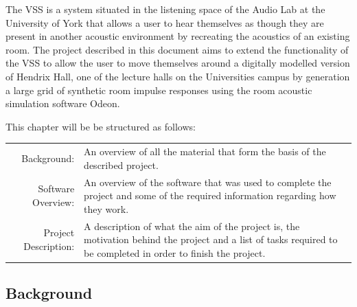 \documentclass[../../main.tex]{subfiles}
\begin{document}
	The \ac{VSS} is a system situated in the listening space of the Audio Lab at the University of York that allows a user to hear themselves as though they are present in another acoustic environment by recreating the acoustics of an existing room. The project described in this document aims to extend the functionality of the \ac{VSS} to allow the user to move themselves around a digitally modelled version of Hendrix Hall, one of the lecture halls on the Universities campus by generation a large grid of synthetic room impulse responses using the room acoustic simulation software Odeon.



	This chapter will be be structured as follows:

	\begin{tabular}{r p{}}
	Background: & An overview of all the material that form the basis of the described project. \\
	Software Overview: & An overview of the software that was used to complete the project and some of the required information regarding how they work. \\
	Project Description: & A description of what the aim of the project is, the motivation behind the project and a list of tasks required to be completed in order to finish the project.
	\end{tabular}

\subsection{Background}


	
\end{document}
